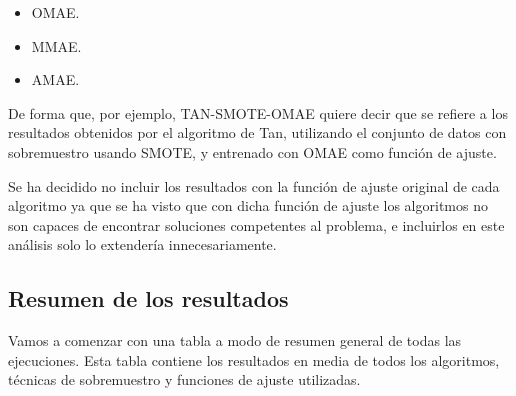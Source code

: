 \begin{itemize}
	\item OMAE.
	\item MMAE.
	\item AMAE.
\end{itemize}

De forma que, por ejemplo, TAN-SMOTE-OMAE quiere decir que se refiere a los resultados obtenidos por el algoritmo de Tan, utilizando el conjunto de datos con sobremuestro usando SMOTE, y entrenado con OMAE como función de ajuste.

Se ha decidido no incluir los resultados con la función de ajuste original de cada algoritmo ya que se ha visto que con dicha función de ajuste los algoritmos no son capaces de encontrar soluciones competentes al problema, e incluirlos en este análisis solo lo extendería innecesariamente.

\subsection{Resumen de los resultados}

Vamos a comenzar con una tabla a modo de resumen general de todas las ejecuciones. Esta tabla contiene los resultados en media de todos los algoritmos, técnicas de sobremuestro y funciones de ajuste utilizadas.

